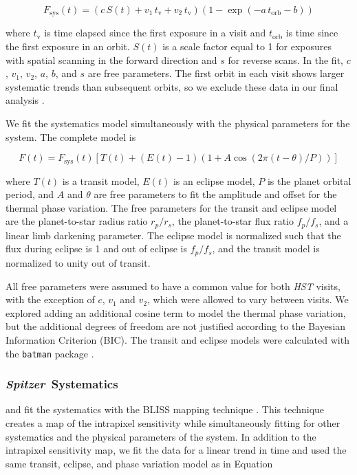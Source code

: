 \documentclass[twocolumn]{aastex61}
\newcommand{\project}[1]{\textsl{#1}}
\newcommand{\Spitzer}{\project{Spitzer}}
\begin{document}
\begin{equation}
 F_\mathrm{sys}(t) = (c\,S(t) + v_1\,t_\mathrm{v} + v_2\,t_\mathrm{v})(1 - \exp(-a\,t_\mathrm{orb} - b))
\end{equation}

\noindent where $t_\mathrm{v}$ is time elapsed since the first exposure in a visit and $t_\mathrm{orb}$ is time since the first exposure in an orbit. $S(t)$ is a scale factor equal to 1 for exposures with spatial scanning in the forward direction and $s$ for reverse scans. In the fit, $c$, $v_1$, $v_2$, $a$, $b$, and $s$ are free parameters. The first orbit in each visit shows larger systematic trends than subsequent orbits, so we exclude these data in our final analysis \citep[a common practice; see e.g.][]{kreidberg14a}.

We fit the systematics model simultaneously with the physical parameters for the system. The complete model is

\begin{equation}
F(t) = F_\mathrm{sys}(t)\left[T(t) + (E(t) - 1)(1 + A\cos(2\pi(t - \theta)/P))\right]
\label{eq:model}
\end{equation}

\noindent where $T(t)$ is a transit model, $E(t)$ is an eclipse model, $P$ is the planet orbital period, and $A$ and $\theta$ are free parameters to fit the amplitude and offset for the thermal phase variation. The free parameters for the transit and eclipse model are the planet-to-star radius ratio $r_p/r_s$, the planet-to-star flux ratio $f_p/f_s$, and a linear limb darkening parameter. The eclipse model is normalized such that the flux during eclipse is 1 and out of eclipse is $f_p/f_s$, and the transit model is normalized to unity out of transit. 



All free parameters were assumed to have a common value for both \emph{HST} visits, with the exception of $c$, $v_1$ and $v_2$, which were allowed to vary between visits. We explored adding an additional cosine term to model the thermal phase variation, but the additional degrees of freedom are not justified according to the Bayesian Information Criterion (BIC). The transit and eclipse models were calculated with the \texttt{batman} package \citep{kreidberg15a}. %


\subsubsection{\Spitzer\ Systematics}
and fit the systematics with the BLISS mapping technique \citep{stevenson12}. This technique creates a map of the intrapixel sensitivity while simultaneously fitting for other systematics and the physical parameters of the system. In addition to the intrapixel sensitivity map, we fit the data for a linear trend in time and used the same transit, eclipse, and phase variation model as in Equation%
\end{document}
